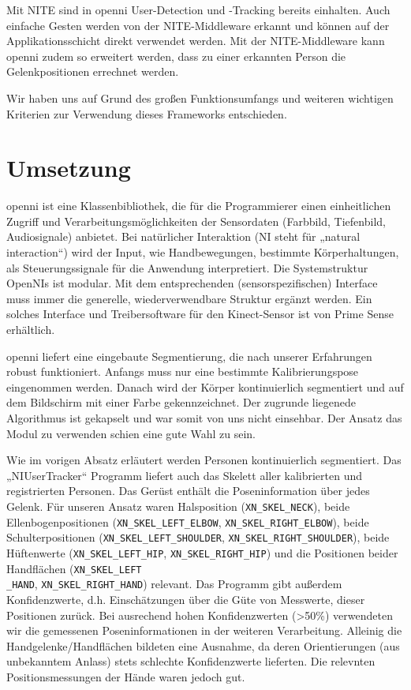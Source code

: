 Mit NITE  sind in \gls{openni}  User-Detection und -Tracking bereits einhalten. Auch einfache Gesten werden von der NITE-Middleware erkannt und können auf der Applikationsschicht direkt verwendet werden. Mit der NITE-Middleware kann \gls{openni} zudem so erweitert werden, dass zu einer erkannten Person die Gelenkpositionen errechnet werden.

Wir haben uns auf Grund des großen Funktionsumfangs und weiteren wichtigen Kriterien zur Verwendung dieses Frameworks entschieden.

\section{Umsetzung}
\label{kinect_umsetzung_sec}

\gls{openni} ist eine Klassenbibliothek, die für die Programmierer einen einheitlichen Zugriff und Verarbeitungsmöglichkeiten
 der Sensordaten (Farbbild, Tiefenbild, Audiosignale) anbietet. Bei natürlicher Interaktion (NI steht für „natural interaction“) wird der Input,
 wie Handbewegungen, bestimmte Körperhaltungen, als Steuerungssignale für die Anwendung interpretiert. Die Systemstruktur OpenNIs ist modular.
 Mit dem entsprechenden (sensorspezifischen) Interface muss immer die generelle, wiederverwendbare Struktur ergänzt werden.
 Ein solches Interface und Treibersoftware für den Kinect-Sensor ist von Prime
 Sense erhältlich. 

\gls{openni} liefert eine eingebaute Segmentierung, die nach unserer Erfahrungen robust funktioniert.
 Anfangs muss nur eine bestimmte Kalibrierungspose eingenommen werden. Danach wird der Körper kontinuierlich segmentiert und
 auf dem Bildschirm mit einer Farbe gekennzeichnet. Der zugrunde liegenede Algorithmus ist gekapselt und war somit von uns nicht einsehbar.
 Der Ansatz das Modul zu verwenden schien eine gute Wahl zu sein.

Wie im vorigen Absatz erläutert werden Personen kontinuierlich segmentiert. Das
„NIUserTracker“ Programm liefert auch das Skelett aller kalibrierten und registrierten Personen. Das Gerüst enthält die Poseninformation über jedes
 Gelenk. Für unseren Ansatz waren Halsposition (\lstinline{XN_SKEL_NECK}), beide
 Ellenbogenpositionen (\lstinline{XN_SKEL_LEFT_ELBOW},
 \lstinline{XN_SKEL_RIGHT_ELBOW}), beide Schulterpositionen
 (\lstinline{XN_SKEL_LEFT_SHOULDER}, \lstinline{XN_SKEL_RIGHT_SHOULDER}), beide
 Hüftenwerte (\lstinline{XN_SKEL_LEFT_HIP}, \lstinline{XN_SKEL_RIGHT_HIP}) und
 die Positionen beider Handflächen (\lstinline{XN_SKEL_LEFT}\\\lstinline{_HAND},
 \lstinline{XN_SKEL_RIGHT_HAND}) relevant. Das Programm gibt außerdem
 Konfidenzwerte, d.h. Einschätzungen über die Güte von Messwerte, dieser Positionen zurück.
 Bei ausrechend hohen Konfidenzwerten (>50\%) verwendeten wir die gemessenen
 Poseninformationen in der weiteren Verarbeitung. Alleinig die Handgelenke/Handflächen bildeten eine Ausnahme,
 da deren Orientierungen (aus unbekanntem Anlass) stets schlechte Konfidenzwerte lieferten. Die relevnten Positionsmessungen der Hände waren jedoch gut.

